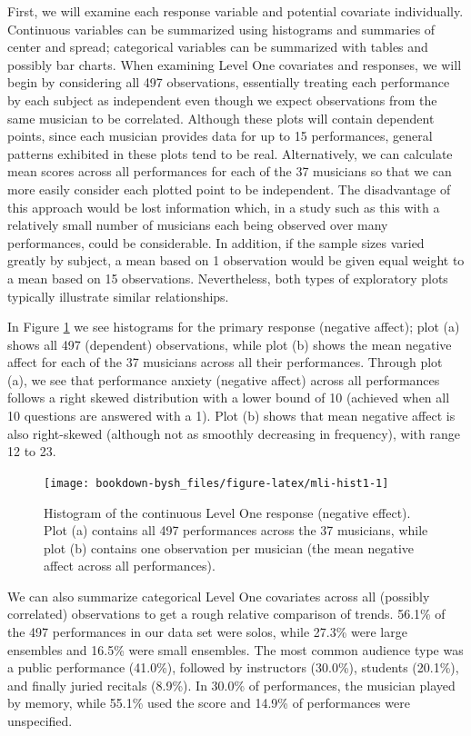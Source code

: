 \documentclass[
]{krantz}
\begin{document}
First, we will examine each response variable and potential covariate individually. Continuous variables can be summarized using histograms and summaries of center and spread; categorical variables can be summarized with tables and possibly bar charts. When examining Level One covariates and responses, we will begin by considering all 497 observations, essentially treating each performance by each subject as independent even though we expect observations from the same musician to be correlated. Although these plots will contain dependent points, since each musician provides data for up to 15 performances, general patterns exhibited in these plots tend to be real. Alternatively, we can calculate mean scores across all performances for each of the 37 musicians so that we can more easily consider each plotted point to be independent. The disadvantage of this approach would be lost information which, in a study such as this with a relatively small number of musicians each being observed over many performances, could be considerable. In addition, if the sample sizes varied greatly by subject, a mean based on 1 observation would be given equal weight to a mean based on 15 observations. Nevertheless, both types of exploratory plots typically illustrate similar relationships.

In Figure \ref{fig:mli-hist1} we see histograms for the primary response (negative affect); plot (a) shows all 497 (dependent) observations, while plot (b) shows the mean negative affect for each of the 37 musicians across all their performances. Through plot (a), we see that performance anxiety (negative affect) across all performances follows a right skewed distribution with a lower bound of 10 (achieved when all 10 questions are answered with a 1). Plot (b) shows that mean negative affect is also right-skewed (although not as smoothly decreasing in frequency), with range 12 to 23.

\begin{figure}

{\centering \texttt{[image: bookdown-bysh\_files/figure-latex/mli-hist1-1]} 

}

\caption{Histogram of the continuous Level One response (negative effect). Plot (a) contains all 497 performances across the 37 musicians, while plot (b) contains one observation per musician (the mean negative affect across all performances).}\label{fig:mli-hist1}
\end{figure}

We can also summarize categorical Level One covariates across all (possibly correlated) observations to get a rough relative comparison of trends. 56.1\% of the 497 performances in our data set were solos, while 27.3\% were large ensembles and 16.5\% were small ensembles. The most common audience type was a public performance (41.0\%), followed by instructors (30.0\%), students (20.1\%), and finally juried recitals (8.9\%). In 30.0\% of performances, the musician played by memory, while 55.1\% used the score and 14.9\% of performances were unspecified.
\end{document}

